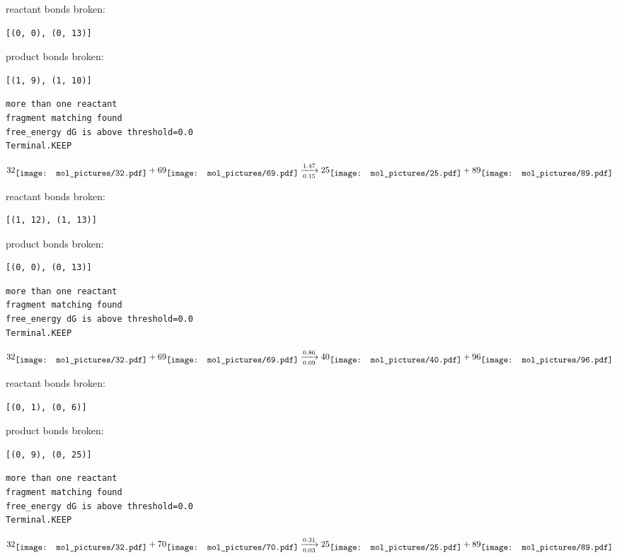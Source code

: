 \documentclass{article}
\begin{document}
reactant bonds broken:\begin{verbatim}
[(0, 0), (0, 13)]
\end{verbatim}
product bonds broken:\begin{verbatim}
[(1, 9), (1, 10)]
\end{verbatim}




\vspace{1cm}
\begin{verbatim}
more than one reactant
fragment matching found
free_energy dG is above threshold=0.0
Terminal.KEEP
\end{verbatim}
$$
32
\raisebox{-.5\height}{\texttt{[image: mol\_pictures/32.pdf]}}
+
69
\raisebox{-.5\height}{\texttt{[image: mol\_pictures/69.pdf]}}
\xrightarrow[0.15]{1.47}
25
\raisebox{-.5\height}{\texttt{[image: mol\_pictures/25.pdf]}}
+
89
\raisebox{-.5\height}{\texttt{[image: mol\_pictures/89.pdf]}}
$$


reactant bonds broken:\begin{verbatim}
[(1, 12), (1, 13)]
\end{verbatim}
product bonds broken:\begin{verbatim}
[(0, 0), (0, 13)]
\end{verbatim}




\vspace{1cm}
\begin{verbatim}
more than one reactant
fragment matching found
free_energy dG is above threshold=0.0
Terminal.KEEP
\end{verbatim}
$$
32
\raisebox{-.5\height}{\texttt{[image: mol\_pictures/32.pdf]}}
+
69
\raisebox{-.5\height}{\texttt{[image: mol\_pictures/69.pdf]}}
\xrightarrow[0.09]{0.86}
40
\raisebox{-.5\height}{\texttt{[image: mol\_pictures/40.pdf]}}
+
96
\raisebox{-.5\height}{\texttt{[image: mol\_pictures/96.pdf]}}
$$


reactant bonds broken:\begin{verbatim}
[(0, 1), (0, 6)]
\end{verbatim}
product bonds broken:\begin{verbatim}
[(0, 9), (0, 25)]
\end{verbatim}




\vspace{1cm}
\begin{verbatim}
more than one reactant
fragment matching found
free_energy dG is above threshold=0.0
Terminal.KEEP
\end{verbatim}
$$
32
\raisebox{-.5\height}{\texttt{[image: mol\_pictures/32.pdf]}}
+
70
\raisebox{-.5\height}{\texttt{[image: mol\_pictures/70.pdf]}}
\xrightarrow[0.03]{0.31}
25
\raisebox{-.5\height}{\texttt{[image: mol\_pictures/25.pdf]}}
+
89
\raisebox{-.5\height}{\texttt{[image: mol\_pictures/89.pdf]}}
$$
\end{document}
